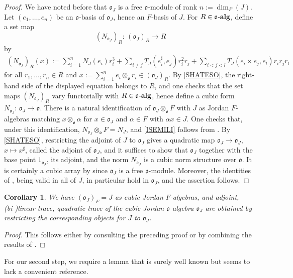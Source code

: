 \documentclass{amsart}
\newtheorem{cor}[equation]{Corollary}
\theoremstyle{definition} %
\theoremstyle{remark} %
\newcommand{\oalg}{\mfo\mathchar45\mathbf{alg}}
\newcommand{\mfo}{\mathfrak{o}}
\renewcommand{\:}{\colon\,}
\numberwithin{equation}{section}
\begin{document}
\begin{proof}
We have noted before that $\mfo_J$ is a free $\mfo$-module of rank $n := \dim_F(J)$. Let $(e_1,\dots,e_n)$ be an $\mfo$-basis of $\mfo_J$, hence an $F$-basis of $J$. For $R \in \oalg$, define a set map 
\[
(N_{\mfo_J})_R\:(\mfo_J)_R \longrightarrow R 
\]
by
\begin{align*}
(N_{\mfo_J})_R(x) := \sum_{i=1}^n N_J(e_i)r_i^3 + \sum_{i\ne j}T_J(e_i^\sharp,e_j)r_i^2r_j + \sum_{i<j<l}T_J(e_i \times e_j,e_l)r_ir_jr_l
\end{align*}
for all $r_1,\dots,r_n \in R$ and $x := \sum_{i=1}^n e_i \otimes_{\mfo} r_i \in (\mfo_J)_R$. By \eqref{SHATESO}, the right-hand side of the displayed equation belongs to $R$, and one checks that the set maps $(N_{\mfo_J})_R$ vary functorially with $R \in \oalg$, hence define a cubic form $N_{\mfo_J}\:\mfo_J \to \mfo$. There is a natural identification of $\mfo_J \otimes_{\mfo} F$ with $J$ as Jordan $F$-algebras matching $x \otimes_{\mfo} \alpha$ for $x \in \mfo_J$ and $\alpha \in F$ with $\alpha x \in J$. One checks that, under this identification, $N_{\mfo_J} \otimes_{\mfo} F = N_J$, and \eqref{ISEMILI} follows from \cite[(12.29.2)]{MR4806163}. By \eqref{SHATESO}, restricting the adjoint of $J$ to $\mfo_J$ gives a quadratic map $\mfo_J \to \mfo_J$, $x \mapsto x^\sharp$, called the adjoint of $\mfo_J$, and it suffices to show that $\mfo_J$ together with the base point $1_{\mfo_J}$, its adjoint, and the norm $N_{\mfo_J}$ is a cubic norm structure over $\mfo$. It is certainly a cubic array by \cite[33.1]{MR4806163} since $\mfo_J$ is a free $\mfo$-module. Moreover, the identities of \cite[Exc.~33.14]{MR4806163}, being valid in all of $J$, in particular hold in $\mfo_J$, and the assertion follows.
\end{proof}

\begin{cor} \label{c.NOSTRO}
We have $(\mfo_J)_F = J$ as cubic Jordan $F$-algebras, and adjoint, (bi-)linear trace, quadratic trace of the cubic Jordan $\mfo$-algebra $\mfo_J$ are obtained by restricting the corresponding objects for $J$ to $\mfo_J$.	
\end{cor}

\begin{proof}
This follows either by consulting the preceding proof or by combining the results of \cite[12.29 and 34.10]{MR4806163}.	
\end{proof}

For our second step, we require a lemma that is surely well known but seems to lack a convenient reference.
\end{document}
